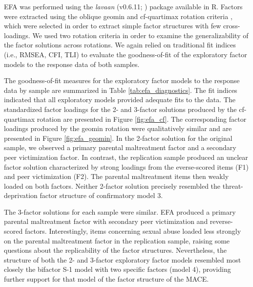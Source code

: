 \documentclass[letterpaper,man,natbib,longtable,floatsintext,12pt]{apa6}
\begin{document}
EFA was performed using the \textit{lavaan} (v0.6.11; \citealt{lavaan}) package available in R. Factors were extracted using the oblique geomin \citep{yates1987multivariate} and cf-quartimax rotation criteria \citep{crawford1970general}, which were selected in order to extract simple factor structures with few cross-loadings. We used two rotation criteria in order to examine the generalizability of the factor solutions across rotations. We again relied on traditional fit indices (i.e., RMSEA, CFI, TLI) to evaluate the goodness-of-fit of the exploratory factor models to the response data of both samples.

The goodness-of-fit measures for the exploratory factor models to the response data by sample are summarized in Table \ref{tab:efa_diagnostics}. The fit indices indicated that all exploratory models provided adequate fits to the data. The standardized factor loadings for the 2- and 3-factor solutions produced by the cf-quartimax rotation are presented in Figure \ref{fig:efa_cf}. The corresponding factor loadings produced by the geomin rotation were qualitatively similar and are presented in Figure \ref{fig:efa_geomin}. In the 2-factor solution for the original sample, we observed a primary parental maltreatment factor and a secondary peer victimization factor. In contrast, the replication sample produced an unclear factor solution characterized by strong loadings from the everse-scored items (F1) and peer victimization (F2). The parental maltreatment items then weakly loaded on both factors. Neither 2-factor solution precisely resembled the threat-deprivation factor structure of confirmatory model 3.

The 3-factor solutions for each sample were similar. EFA produced a primary parental maltreatment factor with secondary peer victimization and reverse-scored factors. Interestingly, items concerning sexual abuse loaded less strongly on the parental maltreatment factor in the replication sample, raising some questions about the replicability of the factor structures. Nevertheless, the structure of both the 2- and 3-factor exploratory factor models resembled most closely the bifactor S-1 model with two specific factors (model 4), providing further support for that model of the factor structure of the MACE. 

\pagebreak
\end{document}
